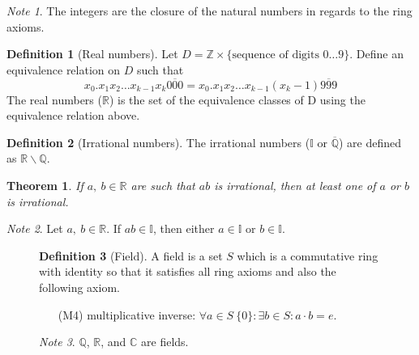 \documentclass{article}
\newcommand*{\Z}{\mathbb{Z}}
\newcommand*{\Q}{\mathbb{Q}}
\newcommand*{\I}{\mathbb{I}}
\newcommand*{\R}{\mathbb{R}}
\newcommand*{\C}{\mathbb{C}}
\theoremstyle{plain}
\newtheorem{theorem}{Theorem}[section]
\numberwithin{theorem}{subsection}
\theoremstyle{definition}
\newtheorem{definition}{Definition}[section]
\numberwithin{definition}{subsection}
\theoremstyle{remark}
\newtheorem{note}{Note}[section]
\numberwithin{note}{subsection}
\begin{document}
\begin{note}
    The integers are the closure of the natural numbers in regards to the ring axioms.
\end{note}
%
\begin{definition}[Real numbers]
    Let $D = \Z \times \{\text{sequence of digits $0\ldots 9$}\}$.
    Define an equivalence relation on $D$ such that
    \begin{equation*}
        x_0 . x_1 x_2 \dots x_{k-1} x_k \overline{000} = x_0 . x_1 x_2 \dots x_{k-1} \left(x_k - 1\right)\overline{999}
    \end{equation*}
    The real numbers ($\R$) is the set of the equivalence classes of D using the equivalence relation above.
\end{definition}
%
\begin{definition}[Irrational numbers]
    The irrational numbers ($\I$ or $\overline{\Q}$) are defined as $\R\backslash\Q$.
\end{definition}
\begin{theorem}
    If $a,\:b\in\R$ are such that $ab$ is irrational, then at least one of $a$ or $b$ is irrational.
\end{theorem}
%
\begin{note}
    Let $a,\: b\in \R$. If $ab\in\I$, then either $a\in\I$ or $b\in\I$.
\end{note}
%
\begin{figure}[H]
    \begin{mdframed}[style=exampledefault,frametitle={Field Axioms}]
        \begin{definition}[Field]
            A field is a set $S$ which is a commutative ring with identity so that it satisfies all ring axioms and also the following axiom.
        \end{definition}
        \begin{enumerate}
            \item[(M4)] multiplicative inverse: $\forall a \in S \ \{0\}:\exists b \in S: a\cdot b=e$.
        \end{enumerate}
    \end{mdframed}
    \begin{note}
        $\Q$, $\R$, and $\C$ are fields.
    \end{note}
\end{figure}
%
\end{document}
